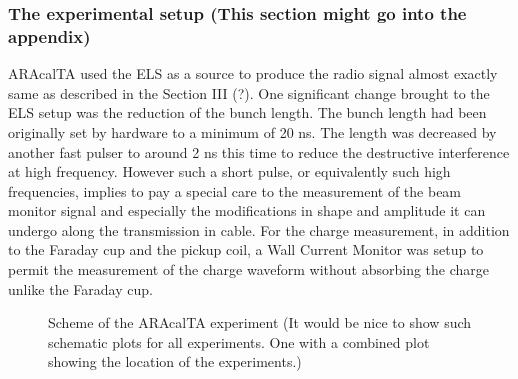 \documentclass[12pt]{article}
\begin{document}
\subsubsection{The experimental setup \color{red}(This section might go into the appendix)\color{black}}
ARAcalTA used the ELS as a source to produce the radio signal almost exactly same as described in the Section  \color{red}III (?). \color{black}
One significant change brought to the ELS setup was the reduction of the bunch length.
The bunch length had been originally set by hardware to a minimum of 20 ns.
The length was decreased by another fast pulser to around 2 ns this time to reduce the destructive
interference at high frequency.
However such a short pulse, or equivalently such high frequencies, implies to pay a special care to the measurement of the beam monitor signal and especially the modifications in shape and amplitude it can undergo along the transmission in cable.
For the charge measurement, in addition to the Faraday cup and the pickup coil, a Wall Current Monitor was setup to permit the measurement of the charge waveform without absorbing the charge unlike the Faraday cup.
\begin{figure}[!h]
  \centering
  \hspace*{-3ex}
  \caption{Scheme of the ARAcalTA experiment \color{red} (It would be nice to show such schematic plots for all experiments. One with a combined plot showing the location of the experiments.) \color{black}}
  \label{fig:scheme}
\end{figure}
\end{document}
